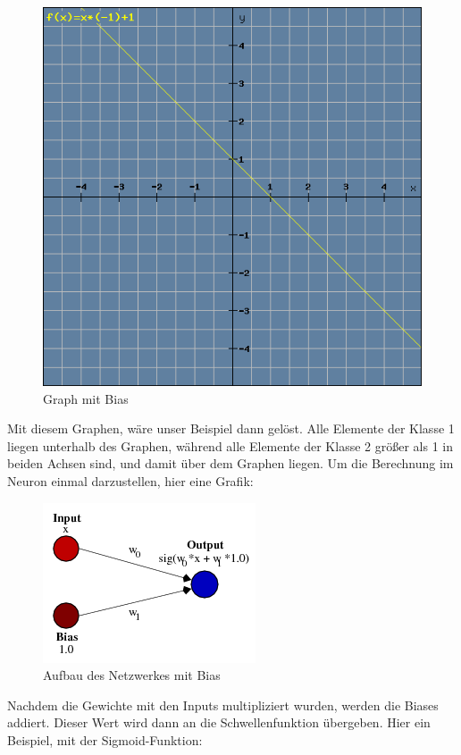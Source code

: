 \documentclass[12pt]{article}
\begin{document}
\begin{figure}[H]
\centering
\includegraphics[scale=0.60]{./Images/Pasted image 20231005144628.png}
\caption{Graph mit Bias}
\label{Graph mit Bias}
\end{figure}
Mit diesem Graphen, wäre unser Beispiel dann gelöst. Alle Elemente der Klasse 1 liegen unterhalb des Graphen, während alle Elemente der Klasse 2 größer als 1 in beiden Achsen sind, und damit über dem Graphen liegen.
Um die Berechnung im Neuron einmal darzustellen, hier eine Grafik:
\begin{figure}[H]
\centering
\includegraphics[scale=0.60]{./Images/Pasted image 20231005133406.png}
\caption{Aufbau des Netzwerkes mit Bias}
\label{Aufbau des Netzwerkes mit Bias}
\end{figure}
Nachdem die Gewichte mit den Inputs multipliziert wurden, werden die Biases addiert. Dieser Wert wird dann an die Schwellenfunktion übergeben. Hier ein Beispiel, mit der Sigmoid-Funktion:
\end{document}
